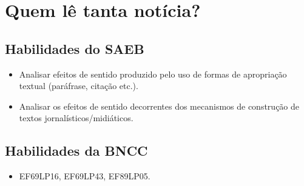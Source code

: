\chapter{Quem lê tanta notícia?}

\section{Habilidades do SAEB}

\begin{itemize}
\item
  Analisar efeitos de sentido produzido pelo uso de formas de
  apropriação textual (paráfrase, citação etc.).
\item
  Analisar os efeitos de sentido decorrentes dos mecanismos de
  construção de textos jornalísticos/midiáticos.
\end{itemize}

\section{Habilidades da BNCC}

\begin{itemize}
\item EF69LP16, EF69LP43, EF89LP05.
\end{itemize}



